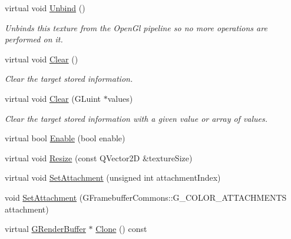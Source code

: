\begin{DoxyCompactItemize}
virtual void \mbox{\hyperlink{class_geometry_engine_1_1_geometry_buffer_1_1_g_render_buffer_ac04be958223e7258bc2d6b8700df9df9}{Unbind}} ()
\begin{DoxyCompactList}\small\item\em Unbinds this texture from the Open\+Gl pipeline so no more operations are performed on it. \end{DoxyCompactList}\item 
\mbox{\label{class_geometry_engine_1_1_geometry_buffer_1_1_g_render_buffer_adff5fe2530a01bb3aac690219b453058}} 
virtual void \mbox{\hyperlink{class_geometry_engine_1_1_geometry_buffer_1_1_g_render_buffer_adff5fe2530a01bb3aac690219b453058}{Clear}} ()
\begin{DoxyCompactList}\small\item\em Clear the target stored information. \end{DoxyCompactList}\item 
\mbox{\label{class_geometry_engine_1_1_geometry_buffer_1_1_g_render_buffer_a0f7768d4786a17b92ed98848c5558ed7}} 
virtual void \mbox{\hyperlink{class_geometry_engine_1_1_geometry_buffer_1_1_g_render_buffer_a0f7768d4786a17b92ed98848c5558ed7}{Clear}} (G\+Luint $\ast$values)
\begin{DoxyCompactList}\small\item\em Clear the target stored information with a given value or array of values. \end{DoxyCompactList}\item 
virtual bool \mbox{\hyperlink{class_geometry_engine_1_1_geometry_buffer_1_1_g_render_buffer_afb80727ba33997fb7f48551de1831111}{Enable}} (bool enable)
\item 
virtual void \mbox{\hyperlink{class_geometry_engine_1_1_geometry_buffer_1_1_g_render_buffer_a3a3e0b2e031cce1c0bea9c2a4bc5465a}{Resize}} (const Q\+Vector2D \&texture\+Size)
\item 
virtual void \mbox{\hyperlink{class_geometry_engine_1_1_geometry_buffer_1_1_g_render_buffer_adb0c62f7d9fb1d61b3ea84bc026fa539}{Set\+Attachment}} (unsigned int attachment\+Index)
\item 
void \mbox{\hyperlink{class_geometry_engine_1_1_geometry_buffer_1_1_g_render_buffer_ae69412d2730060177ad8479a6a4d313c}{Set\+Attachment}} (G\+Framebuffer\+Commons\+::\+G\+\_\+\+C\+O\+L\+O\+R\+\_\+\+A\+T\+T\+A\+C\+H\+M\+E\+N\+TS attachment)
\item 
virtual \mbox{\hyperlink{class_geometry_engine_1_1_geometry_buffer_1_1_g_render_buffer}{G\+Render\+Buffer}} $\ast$ \mbox{\hyperlink{class_geometry_engine_1_1_geometry_buffer_1_1_g_render_buffer_a451303386c519d70d50875873dc7b1fc}{Clone}} () const
\end{DoxyCompactItemize}
